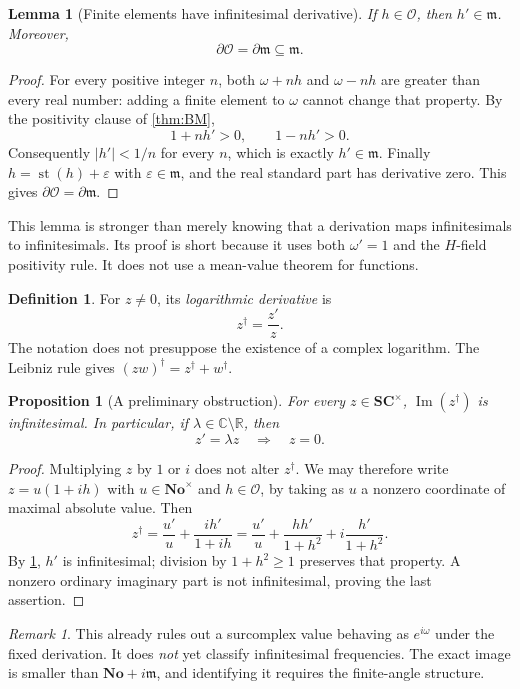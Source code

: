 \documentclass[11pt,letterpaper]{article}
\numberwithin{equation}{section}
\newtheorem{lemma}[lemma]{Lemma}
\newtheorem{proposition}[proposition]{Proposition}
\theoremstyle{definition}
\newtheorem{definition}[definition]{Definition}
\theoremstyle{remark}
\newtheorem{remark}[remark]{Remark}
\newcommand{\No}{\mathbf{No}}
\newcommand{\SC}{\mathbf{SC}}
\newcommand{\R}{\mathbb R}
\newcommand{\C}{\mathbb C}
\newcommand{\OO}{\mathcal O}
\newcommand{\mm}{\mathfrak m}
\newcommand{\der}{\partial}
\newcommand{\st}{\operatorname{st}}
\newcommand{\im}{\operatorname{Im}}
\newcommand{\eps}{\varepsilon}
\begin{document}
\begin{lemma}[Finite elements have infinitesimal derivative]\label{lem:finite}
If $h\in\OO$, then $h'\in\mm$. Moreover,
\[
 \der\OO=\der\mm\subseteq\mm.
\]
\end{lemma}
\begin{proof}
For every positive integer $n$, both $\omega+nh$ and $\omega-nh$ are greater than every real number: adding a finite element to $\omega$ cannot change that property. By the positivity clause of \cref{thm:BM},
\[
 1+nh'>0,\qquad 1-nh'>0.
\]
Consequently $|h'|<1/n$ for every $n$, which is exactly $h'\in\mm$. Finally $h=\st(h)+\eps$ with $\eps\in\mm$, and the real standard part has derivative zero. This gives $\der\OO=\der\mm$.
\end{proof}

This lemma is stronger than merely knowing that a derivation maps infinitesimals to infinitesimals. Its proof is short because it uses both $\omega'=1$ and the $H$-field positivity rule. It does not use a mean-value theorem for functions.

\begin{definition}
For $z\ne0$, its \emph{logarithmic derivative} is
\[
 z^\dagger=\frac{z'}{z}.
\]
The notation does not presuppose the existence of a complex logarithm. The Leibniz rule gives $(zw)^\dagger=z^\dagger+w^\dagger$.
\end{definition}

\begin{proposition}[A preliminary obstruction]\label{prop:coarse}
For every $z\in\SC^\times$, $\im(z^\dagger)$ is infinitesimal. In particular, if $\lambda\in\C\setminus\R$, then
\[
 z'=\lambda z\quad\Longrightarrow\quad z=0.
\]
\end{proposition}
\begin{proof}
Multiplying $z$ by $1$ or $i$ does not alter $z^\dagger$. We may therefore write $z=u(1+ih)$ with $u\in\No^\times$ and $h\in\OO$, by taking as $u$ a nonzero coordinate of maximal absolute value. Then
\[
 z^\dagger=\frac{u'}u+\frac{ih'}{1+ih}
 =\frac{u'}u+\frac{hh'}{1+h^2}+i\frac{h'}{1+h^2}.
\]
By \cref{lem:finite}, $h'$ is infinitesimal; division by $1+h^2\geq1$ preserves that property. A nonzero ordinary imaginary part is not infinitesimal, proving the last assertion.
\end{proof}

\begin{remark}
This already rules out a surcomplex value behaving as $e^{i\omega}$ under the fixed derivation. It does \emph{not} yet classify infinitesimal frequencies. The exact image is smaller than $\No+i\mm$, and identifying it requires the finite-angle structure.
\end{remark}
\end{document}
